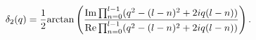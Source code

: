 \begin{equation}
\delta_2(q)=\frac{1}{2}{\rm arctan}\left(\frac{{\rm
Im}\prod_{n=0}^{l-1}(q^2-(l-n)^2+2iq(l-n))}{{\rm
Re}\prod_{n=0}^{l-1}(q^2-(l-n)^2+2iq(l-n))}\right). \label{phases}
\end{equation}

